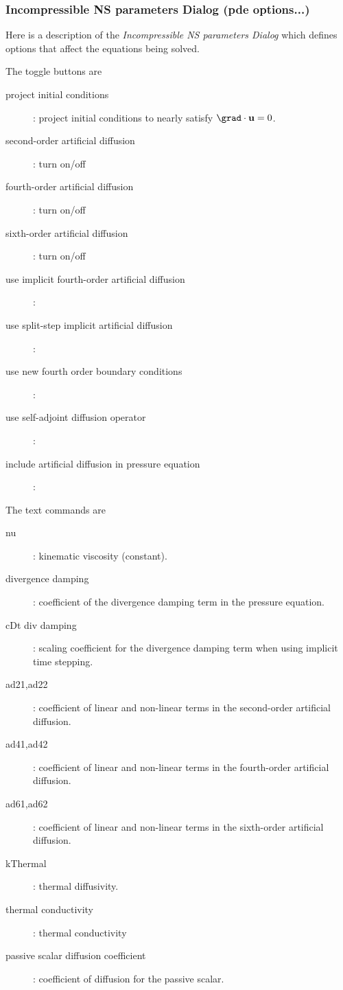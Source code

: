 \documentclass{article}
\begin{document}
\subsubsection{Incompressible NS parameters Dialog (pde options...)}\label{sec:pdeOptions}

Here is a description of the {\em Incompressible NS parameters Dialog} which defines
options that affect the equations being solved.

\noindent The toggle buttons are
\begin{description}
  \item[\qquad project initial conditions] : project initial conditions to nearly satisfy $\grad\cdot\uv=0$. 
  \item[\qquad second-order artificial diffusion] : turn on/off
  \item[\qquad fourth-order artificial diffusion] : turn on/off
  \item[\qquad sixth-order artificial diffusion] : turn on/off
  \item[\qquad use implicit fourth-order artificial diffusion] : 
  \item[\qquad use split-step implicit artificial diffusion] : 
  \item[\qquad use new fourth order boundary conditions] : 
  \item[\qquad use self-adjoint diffusion operator] : 
  \item[\qquad include artificial diffusion in pressure equation] : 
\end{description}

\noindent The text commands are
\begin{description}
  \item[\qquad nu] : kinematic viscosity (constant).
  \item[\qquad divergence damping] : coefficient of the divergence damping term in the pressure equation.
  \item[\qquad cDt div damping] : scaling coefficient for the divergence damping term when using implicit time
                                   stepping.
  \item[\qquad ad21,ad22] : coefficient of linear and non-linear terms in the second-order artificial diffusion.
  \item[\qquad ad41,ad42] : coefficient of linear and non-linear terms in the fourth-order artificial diffusion.
  \item[\qquad ad61,ad62] : coefficient of linear and non-linear terms in the sixth-order artificial diffusion.
  \item[\qquad kThermal] : thermal diffusivity. 
  \item[\qquad thermal conductivity] : thermal conductivity 
  \item[\qquad passive scalar diffusion coefficient] : coefficient of diffusion for the passive scalar.
\end{description}
\end{document}
